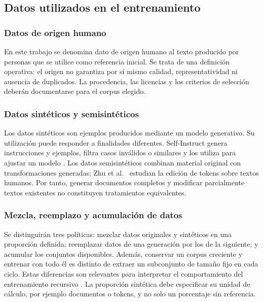 \documentclass[12pt,letterpaper]{article}
\begin{document}
\subsection{Datos utilizados en el entrenamiento}

\subsubsection{Datos de origen humano}

En este trabajo se denomina dato de origen humano al texto producido por
personas que se utilice como referencia inicial. Se trata de una definición
operativa: el origen no garantiza por sí mismo calidad, representatividad
ni ausencia de duplicados. La procedencia, las licencias y los criterios
de selección deberán documentarse para el corpus elegido.

\subsubsection{Datos sintéticos y semisintéticos}

Los datos sintéticos son ejemplos producidos mediante un modelo generativo.
Su utilización puede responder a finalidades diferentes. Self-Instruct
genera instrucciones y ejemplos, filtra casos inválidos o similares y los
utiliza para ajustar un modelo \cite{wang2023selfinstruct}. Los datos
semisintéticos combinan material original con transformaciones generadas;
Zhu et al.\ \cite{zhu2025} estudian la edición de tokens sobre textos humanos.
Por tanto, generar documentos completos y modificar parcialmente textos
existentes no constituyen tratamientos equivalentes.

\subsubsection{Mezcla, reemplazo y acumulación de datos}

Se distinguirán tres políticas: mezclar datos originales y sintéticos en
una proporción definida; reemplazar datos de una generación por los de la
siguiente; y acumular los conjuntos disponibles. Además, conservar un corpus
creciente y entrenar con todo él es distinto de extraer un subconjunto de
tamaño fijo en cada ciclo. Estas diferencias son relevantes para interpretar
el comportamiento del entrenamiento recursivo \cite{kazdan2025}. La
proporción sintética debe especificar su unidad de cálculo, por ejemplo
documentos o tokens, y no solo un porcentaje sin referencia.
\end{document}
